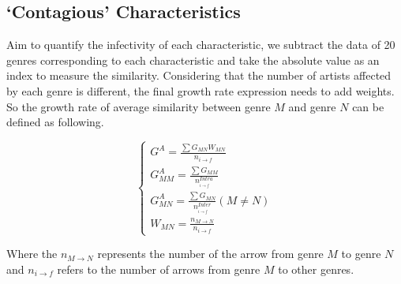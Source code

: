 \documentclass{mcmthesis}
\begin{document}
\subsection{‘Contagious’ Characteristics}
Aim to quantify the infectivity of each characteristic, we subtract the data of 20 genres corresponding to each characteristic and take the absolute value as an index to measure the similarity. Considering that the number of artists affected by each genre is different, the final growth rate expression needs to add weights. So the growth rate of average similarity between genre $M$ and genre $N$ can be defined as following.
\vspace{-0.35cm} %
\begin{spacing}{1.4}
	\large
\begin{equation}
\left\{ \begin{array}{l}
{G^A} = \frac{{\sum {{G_{MN}}{W_{MN}}} }}{{{n_{i \to f}}}}\\
G_{MM}^A = \frac{{\sum {{G_{MM}}} }}{{n_{_{i \to f}}^{Intra}}}\\
G_{MN}^A = \frac{{\sum {{G_{MN}}} }}{{n_{_{i \to f}}^{Inter}}}(M \ne N)\\
{W_{MN}} = \frac{{{n_{M \to N}}}}{{{n_{i \to f}}}}
\end{array} \right.
\end{equation}
\end{spacing}
\vspace{-0.35cm} %
Where the ${{n_{M \to N}}}$ represents the number of the arrow from genre $M$ to genre $N$ and ${{n_{i \to f}}}$ refers to the number of arrows from genre $M$ to other genres.
\end{document}
